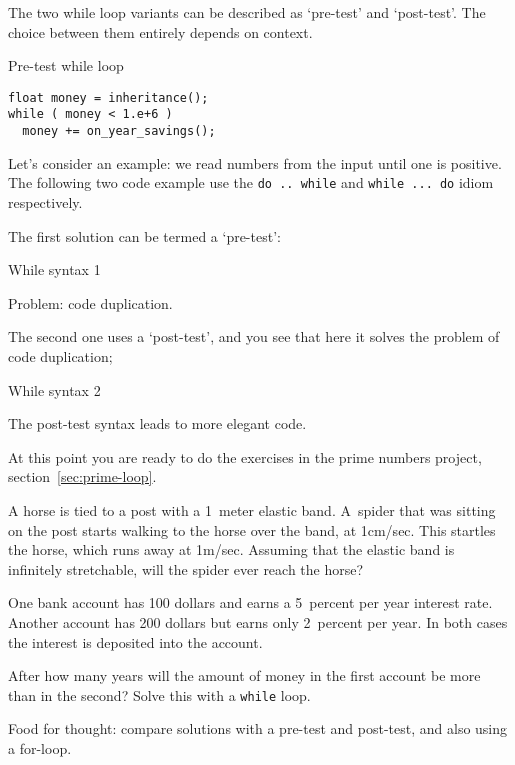 The two while loop variants can be described as `pre-test' and
`post-test'. The choice between them entirely depends on context.

\begin{block}{Pre-test while loop}
  \label{sl:while-pre}
\begin{lstlisting}
float money = inheritance();
while ( money < 1.e+6 )
  money += on_year_savings();
\end{lstlisting}
\end{block}

Let's consider an example: we read numbers from the input
until one is positive.
The following two code example use the \lstinline{do .. while}
and \lstinline{while ... do} idiom respectively.

The first solution can be termed a `pre-test':

\begin{block}{While syntax 1}
  \label{sl:while2}

  Problem: code duplication.
\end{block}

The second one uses a `post-test', and you see
that here it solves the problem of code duplication;

\begin{block}{While syntax 2}
  \label{sl:while3}

  The post-test syntax leads to more elegant code.
\end{block}

\begin{exercise}
  At this point you are ready to do the exercises
  in the prime numbers project, section~\ref{sec:prime-loop}.
\end{exercise}

\begin{exercise}
  \label{ex:horsespider}
  A horse is tied to a post with a 1~meter elastic band. A~spider that
  was sitting on the post starts walking to the horse over the band,
  at 1cm/sec. This startles the horse, which runs away at
  1m/sec. Assuming that the elastic band is infinitely stretchable,
  will the spider ever reach the horse?
\end{exercise}
\begin{exercise}
  \label{ex:interest}
  One bank account has 100 dollars and earns a 5~percent per year interest
  rate. Another account has 200 dollars but earns only 2~percent per
  year. In both cases the interest is deposited into the account.
  
  After how many years will the amount of money in the first account
  be more than in the second? Solve this with a \lstinline{while} loop.

  Food for thought: compare solutions with a pre-test and post-test,
  and also using a for-loop.
\end{exercise}

